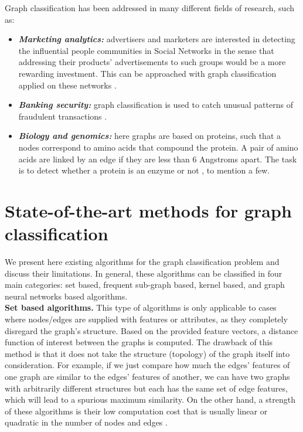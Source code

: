 Graph classification has been addressed in many different fields of research, such as:
\begin{itemize}
    \item \textbf{\emph{Marketing analytics:}} advertisers and marketers  are interested in detecting the influential people communities in Social Networks in the sense that addressing their products' advertisements to such groups would be a more rewarding investment. This can be approached with graph classification applied on these networks \citep{marketing_analytics}.
    \item \textbf{\emph{Banking security:}} graph classification is used to catch unusual patterns of fraudulent transactions \citep{banking_security}.
    \item \textbf{\emph{Biology and genomics:}} here graphs are based on proteins, such that a nodes correspond
to amino acids that compound the protein.  A pair of amino acids are linked by an edge if they are less than 6 Angstroms apart. The task is to detect whether a protein is an enzyme or not \citep{protein_application}, to mention a few.
\end{itemize}

\section{State-of-the-art methods for graph classification}
\label{section:state}
We  present here existing algorithms for the graph classification problem and discuss their limitations. In general, these algorithms can be classified in four main categories: set based, frequent sub-graph based, kernel based, and graph neural networks based algorithms.\\

\noindent\textbf{Set based algorithms.} This type of algorithms is only applicable to cases where nodes/edges are supplied with features or attributes, as they completely disregard the graph's structure. Based on the provided feature vectors, a distance function of interest between the graphs is computed. %
The drawback of this method is that it does not take the structure (topology) of the graph itself into consideration. For example, if we just compare how much the edges' features of one graph are similar to the edges' features of another, we can have two graphs with arbitrarily different structures but each has the same set of edge features, which will lead to a spurious maximum similarity.
On the other hand, a strength of these algorithms is their low computation cost that is usually linear or quadratic in the number of nodes and edges \citep{graphlet_kernel}.\\
 
